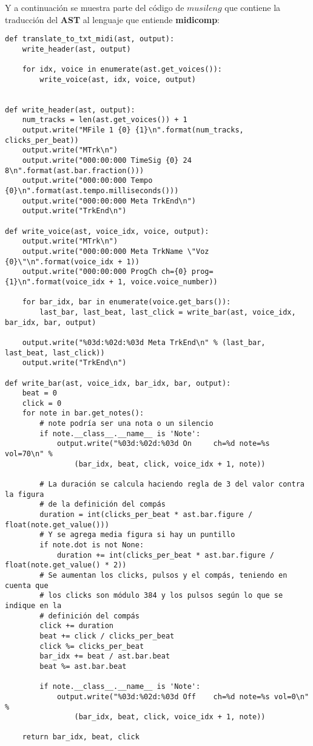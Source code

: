 \newpage

Y a continuación se muestra parte del código de $musileng$ que contiene la traducción del \textbf{AST} al lenguaje que entiende \textbf{midicomp}:

\begin{verbatim}
def translate_to_txt_midi(ast, output):
    write_header(ast, output)

    for idx, voice in enumerate(ast.get_voices()):
        write_voice(ast, idx, voice, output)


def write_header(ast, output):
    num_tracks = len(ast.get_voices()) + 1
    output.write("MFile 1 {0} {1}\n".format(num_tracks, clicks_per_beat))
    output.write("MTrk\n")
    output.write("000:00:000 TimeSig {0} 24 8\n".format(ast.bar.fraction()))
    output.write("000:00:000 Tempo {0}\n".format(ast.tempo.milliseconds()))
    output.write("000:00:000 Meta TrkEnd\n")
    output.write("TrkEnd\n")

def write_voice(ast, voice_idx, voice, output):
    output.write("MTrk\n")
    output.write("000:00:000 Meta TrkName \"Voz {0}\"\n".format(voice_idx + 1))
    output.write("000:00:000 ProgCh ch={0} prog={1}\n".format(voice_idx + 1, voice.voice_number))

    for bar_idx, bar in enumerate(voice.get_bars()):
        last_bar, last_beat, last_click = write_bar(ast, voice_idx, bar_idx, bar, output)

    output.write("%03d:%02d:%03d Meta TrkEnd\n" % (last_bar, last_beat, last_click))
    output.write("TrkEnd\n")

def write_bar(ast, voice_idx, bar_idx, bar, output):
    beat = 0
    click = 0
    for note in bar.get_notes():
        # note podría ser una nota o un silencio
        if note.__class__.__name__ is 'Note':
            output.write("%03d:%02d:%03d On     ch=%d note=%s vol=70\n" %
                (bar_idx, beat, click, voice_idx + 1, note))

        # La duración se calcula haciendo regla de 3 del valor contra la figura
        # de la definición del compás
        duration = int(clicks_per_beat * ast.bar.figure / float(note.get_value()))
        # Y se agrega media figura si hay un puntillo
        if note.dot is not None:
            duration += int(clicks_per_beat * ast.bar.figure / float(note.get_value() * 2))
        # Se aumentan los clicks, pulsos y el compás, teniendo en cuenta que
        # los clicks son módulo 384 y los pulsos según lo que se indique en la
        # definición del compás
        click += duration
        beat += click / clicks_per_beat
        click %= clicks_per_beat
        bar_idx += beat / ast.bar.beat
        beat %= ast.bar.beat

        if note.__class__.__name__ is 'Note':
            output.write("%03d:%02d:%03d Off    ch=%d note=%s vol=0\n" %
                (bar_idx, beat, click, voice_idx + 1, note))

    return bar_idx, beat, click
\end{verbatim}

\clearpage
